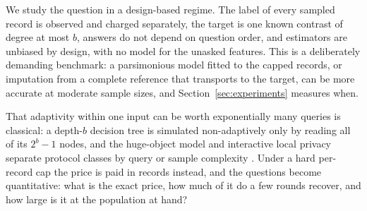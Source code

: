 \documentclass{article}
\begin{document}
We study the question in a design-based regime. The label of every sampled record is observed and charged separately, the target is one known contrast of degree at most $b$, answers do not depend on question order, and estimators are unbiased by design, with no model for the unasked features. This is a deliberately demanding benchmark: a parsimonious model fitted to the capped records, or imputation from a complete reference that transports to the target, can be more accurate at moderate sample sizes, and Section~\ref{sec:experiments} measures when.

That adaptivity within one input can be worth exponentially many queries is classical: a depth-$b$ decision tree is simulated non-adaptively only by reading all of its $2^b-1$ nodes, and the huge-object model and interactive local privacy separate protocol classes by query or sample complexity \citep{goldreich2022,adar2024,joseph2019,joseph2020}. Under a hard per-record cap the price is paid in records instead, and the questions become quantitative: what is the exact price, how much of it do a few rounds recover, and how large is it at the population at hand?
\end{document}
